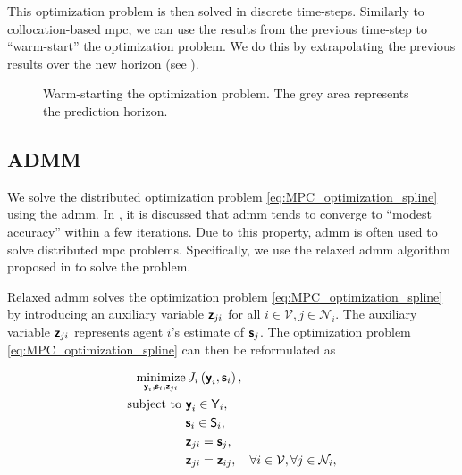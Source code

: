 This optimization problem is then solved in discrete time-steps.
Similarly to collocation-based \gls{mpc}, we can use the results from the previous time-step to ``warm-start'' the optimization problem.
We do this by extrapolating the previous results over the new horizon (see ).

\begin{figure}[t]
    \centering
    
    \vspace*{-2mm}
    \caption{Warm-starting the optimization problem. The grey area represents the prediction horizon.}
    \label{fig:MPC_warm_start}
\end{figure}



\subsection{ADMM}

We solve the distributed optimization problem \eqref{eq:MPC_optimization_spline} using the \acrfull{admm}.
In \cite{boyd_2011_distributed}, it is discussed that \gls{admm} tends to converge to ``modest accuracy'' within a few iterations.
Due to this property, \gls{admm} is often used to solve distributed \gls{mpc} problems.
Specifically, we use the relaxed \gls{admm} algorithm proposed in \cite{bastianello_asynchronous_2021} to solve the problem.

Relaxed \gls{admm} solves the optimization problem \eqref{eq:MPC_optimization_spline} by introducing an auxiliary variable $\boldsymbol{\mathsf{z}}_{ji}$ for all $i \in \mathcal{V}, j \in \mathcal{N}_i$.
The auxiliary variable $\boldsymbol{\mathsf{z}}_{ji}$ represents agent $i$'s estimate of $\boldsymbol{\mathsf{s}}_{j}$.
The optimization problem \eqref{eq:MPC_optimization_spline} can then be reformulated as

\begin{subequations}
    \begin{align}
            \operatorname*{minimize}_{\boldsymbol{\mathsf{y}}_i, \boldsymbol{\mathsf{s}}_i, \boldsymbol{\mathsf{z}}_{ji}} &\, J_i\left(\boldsymbol{\mathsf{y}}_i, \boldsymbol{\mathsf{s}}_i\right), \\
        \text{subject to } & \boldsymbol{\mathsf{y}}_i \in \mathsf{Y}_i, \\
        & \boldsymbol{\mathsf{s}}_i \in \mathsf{S}_i, \\
        & \boldsymbol{\mathsf{z}}_{ji} = \boldsymbol{\mathsf{s}}_j, \\
        & \boldsymbol{\mathsf{z}}_{ji} = \boldsymbol{\mathsf{z}}_{ij}, \quad \forall i \in \mathcal{V}, \forall j \in \mathcal{N}_i,
    \end{align} \label{eq:MPC_optimization_ADMM} 
\end{subequations}

